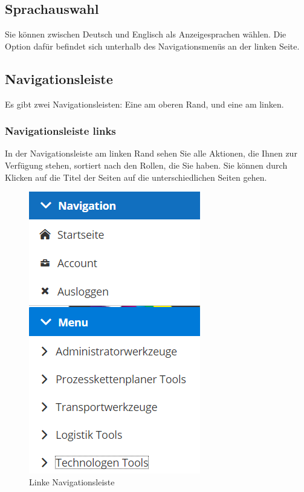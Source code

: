 \documentclass[enabledeprecatedfontcommands,fontsize=12pt,paper=a4,twoside]{scrartcl}
\begin{document}
\subsection{Sprachauswahl}
Sie können zwischen Deutsch und Englisch als Anzeigesprachen wählen. Die Option dafür befindet sich unterhalb des Navigationsmenüs an der linken Seite. \\


\subsection{Navigationsleiste}
Es gibt zwei Navigationsleisten: Eine am oberen Rand, und eine am linken. \\


\subsubsection{Navigationsleiste links}
In der Navigationsleiste am linken Rand sehen Sie alle Aktionen, die Ihnen zur Verfügung stehen, sortiert nach den Rollen, die Sie haben. Sie können durch Klicken auf die Titel der Seiten auf die unterschiedlichen Seiten gehen. \\

\begin{figure}[h!]
\begin{center}
 \includegraphics[scale=0.6]{screenshots/allgemein/navigationlinks.png}
  \caption{Linke Navigationsleiste}
  \label{fig:boat1}
\end{center}
\end{figure}
\end{document}
